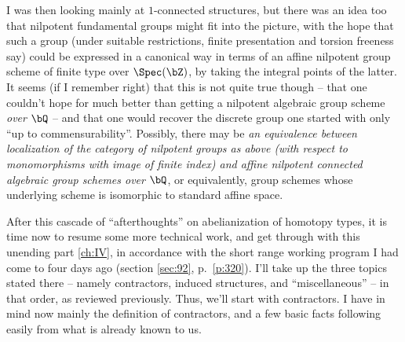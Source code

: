 I was then looking mainly at $1$-connected structures, but there was
an idea too that nilpotent fundamental groups might fit into the
picture, with the hope that such a group (under suitable restrictions,
finite presentation and torsion freeness say) could be expressed in a
canonical way in terms of an affine nilpotent group scheme of finite
type over $\Spec(\bZ)$, by taking the integral points of the
latter. It seems (if I remember right) that this is not quite true
though -- that one couldn't hope for much better than getting a
nilpotent algebraic group scheme \emph{over $\bQ$} -- and that one
would recover the discrete group one started with only ``up to
commensurability''. Possibly, there may be \emph{an equivalence
  between localization of the category of nilpotent groups as above
  \textup(with respect to monomorphisms with image of finite
  index\textup) and affine nilpotent connected algebraic group schemes
  over $\bQ$}, or equivalently, group schemes whose underlying scheme
is isomorphic to standard affine space.

\bigbreak

\presectionfill{}\par

\label{sec:95}%
After this cascade of ``afterthoughts'' on abelianization of homotopy
types, it is time now to resume some more technical work, and get
through with this unending part \ref{ch:IV}, in accordance with the
short range working program I had come to four days ago (section
\ref{sec:92}, p.\ \ref{p:320}). I'll take up the three topics stated
there -- namely contractors, induced structures, and ``miscellaneous''
-- in that order, as reviewed previously. Thus, we'll start with
contractors. I have in mind now mainly the definition of contractors,
and a few basic facts following easily from what is already known to
us.


